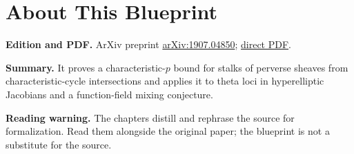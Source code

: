 

\chapter*{About This Blueprint}
\label{bounds-stalks-perverse-sheaves-characteristic-p-shende-about}


\textbf{Edition and PDF.} ArXiv preprint \href{https://arxiv.org/abs/1907.04850}{arXiv:1907.04850}; \href{https://arxiv.org/pdf/1907.04850}{direct PDF}.

\textbf{Summary.} It proves a characteristic-$p$ bound for stalks of perverse sheaves from characteristic-cycle intersections and applies it to theta loci in hyperelliptic Jacobians and a function-field mixing conjecture.

\textbf{Reading warning.} The chapters distill and rephrase the source for formalization. Read them alongside the original paper; the blueprint is not a substitute for the source.









